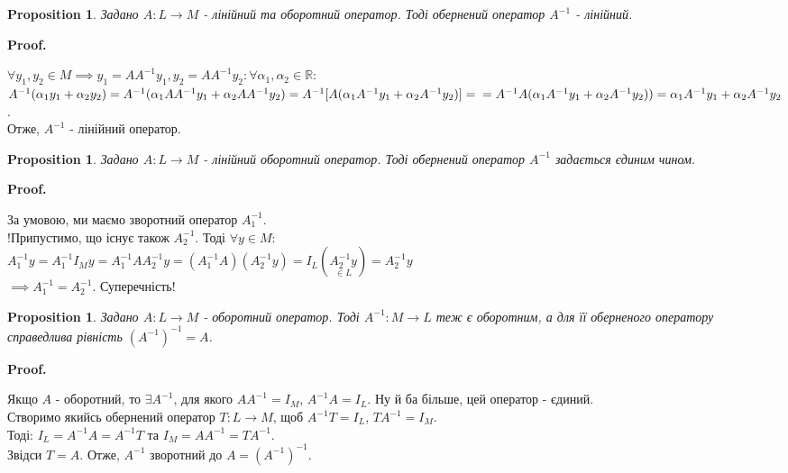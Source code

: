 \documentclass[a4paper, 10pt]{article}
\makeatletter
\theoremstyle{theoremdd}
\newtheorem{proposition}[theorem]{Proposition}
\renewenvironment{proof}[1][Proof.\\]{\par
\pushQED{\hfill \qed}%
\normalfont \topsep6\p@\@plus6\p@\relax
\trivlist
\item\relax
{\bfseries
#1\@addpunct{.}}\hspace\labelsep\ignorespaces
}{%
\popQED\endtrivlist\@endpefalse
}
\makeatother
\begin{document}
	\begin{proposition}
	Задано $A: L \to M$ - лінійний та оборотний оператор. Тоді обернений оператор $A^{-1}$ - лінійний.
	\end{proposition}
	
	\begin{proof}
	$\forall y_1, y_2 \in M \implies y_1 = AA^{-1}y_1, y_2 = AA^{-1}y_2: \forall \alpha_1, \alpha_2 \in \mathbb{R}:$\\
	$A^{-1}(\alpha_1 y_1 + \alpha_2 y_2) = A^{-1}(\alpha_1 AA^{-1}y_1 + \alpha_2 AA^{-1}y_2) = A^{-1}[A(\alpha_1 A^{-1}y_1 + \alpha_2 A^{-1}y_2)] = \\ = A^{-1}A(\alpha_1 A^{-1}y_1 + \alpha_2 A^{-1}y_2)) = \alpha_1 A^{-1}y_1 + \alpha_2 A^{-1}y_2$.\\
	Отже, $A^{-1}$ - лінійний оператор.
	\end{proof}
	
	\begin{proposition}
	Задано $A \colon L \to M$ - лінійний оборотний оператор. Тоді обернений оператор $A^{-1}$ задається єдиним чином.
	\end{proposition}
	
	\begin{proof}
	За умовою, ми маємо зворотний оператор $A_1^{-1}$.\\
	!Припустимо, що існує також $A^{-1}_2$. Тоді $\forall y \in M:$\\
	$A^{-1}_1 y = A^{-1}_1 I_M y = A^{-1}_1 A A^{-1}_2 y = (A^{-1}_1 A) (A^{-1}_2 y) = I_L (\underset{\in L}{A^{-1}_2 y}) = A_2^{-1}y$\\
	$\implies A^{-1}_1 = A^{-1}_2$. Суперечність!
	\end{proof}
	
	\begin{proposition}
	Задано $A \colon L \to M$ - оборотний оператор. Тоді $A^{-1} \colon M \to L$ теж є оборотним, а для її оберненого оператору справедлива рівність $(A^{-1})^{-1} = A$.
	\end{proposition}
	
	\begin{proof}
	Якщо $A$ - оборотний, то $\exists A^{-1}$, для якого $AA^{-1} = I_M$, $A^{-1}A = I_L$. Ну й ба більше, цей оператор - єдиний.\\
	Створимо якийсь обернений оператор $T: L \to M$, щоб $A^{-1}T = I_L$, $TA^{-1} = I_M$.\\
	Тоді: $I_L = A^{-1}A = A^{-1}T$ та $I_M = AA^{-1} = TA^{-1}$.\\
	Звідси $T = A$. Отже, $A^{-1}$ зворотний до $A = (A^{-1})^{-1}$.
	\end{proof}
	
\end{document}
